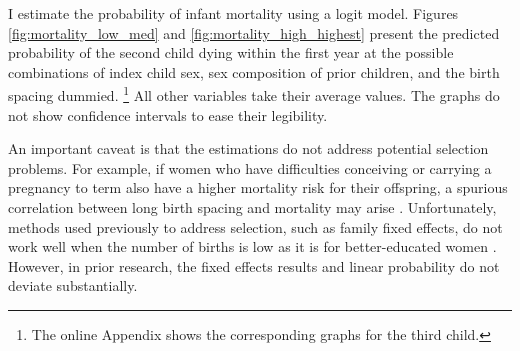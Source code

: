 \documentclass[12pt,letterpaper]{article}
\begin{document}
I estimate the probability of infant mortality using a logit model.
Figures \ref{fig:mortality_low_med} and \ref{fig:mortality_high_highest} present 
the predicted probability of the second child dying within the first year at the 
possible combinations of index child sex, sex composition of prior children, and 
the birth spacing dummied.%
\footnote{
The online Appendix shows the corresponding graphs for the third child.
}
All other variables take their average values.
The graphs do not show confidence intervals to ease their legibility.

An important caveat is that the estimations do not 
address potential selection problems.
For example, if women who have difficulties conceiving or carrying a pregnancy 
to term also have a higher mortality risk for their offspring, a spurious correlation 
between long birth spacing and mortality may arise \citep{Kozuki2013}. 
Unfortunately, methods used previously to address selection, such
as family fixed effects, do not work well when the number of births is
low as it is for better-educated women \citep{Kozuki2013,Molitoris2019}.
However, in prior research, the fixed effects results and linear probability do not 
deviate substantially.
\end{document}
